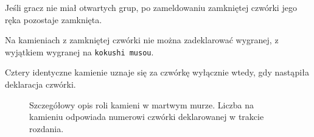Jeśli gracz nie miał otwartych grup, po zameldowaniu zamkniętej czwórki jego
ręka pozostaje zamknięta.

Na kamieniach z zamkniętej czwórki nie można zadeklarować wygranej, z wyjątkiem
wygranej na \texttt{kokushi musou}.

Cztery identyczne kamienie uznaje się za czwórkę wyłącznie wtedy, gdy nastąpiła
deklaracja czwórki.

\begin{figure}[h]
    \centering
    
    \caption{Szczegółowy opis roli kamieni w martwym murze. Liczba na kamieniu
    odpowiada numerowi czwórki deklarowanej w trakcie rozdania.}
    \label{fig:dead-wall}
\end{figure}
